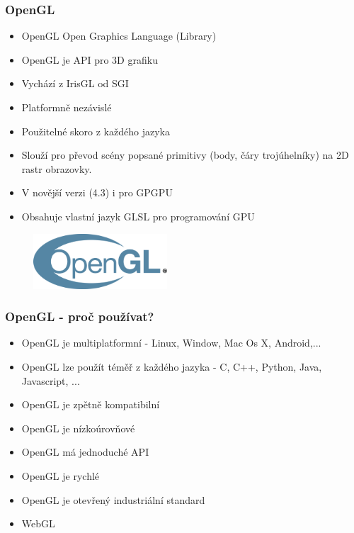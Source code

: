 
\begin{frame}
\frametitle{OpenGL}
  \begin{itemize}
  \item OpenGL Open Graphics Language (Library) 
  \item OpenGL je API pro 3D grafiku 
  \item Vychází z IrisGL od SGI 
  \item Platformně nezávislé 
  \item Použitelné skoro z každého jazyka 
  \item Slouží pro převod scény popsané primitivy (body, čáry trojúhelníky)  na 2D rastr obrazovky.
  \item V novější verzi (4.3) i pro GPGPU
  \item Obsahuje vlastní jazyk GLSL pro programování GPU
  \end{itemize}
  \begin{figure}[h]
  \includegraphics[width=5cm,keepaspectratio]{pics/opengl/logo}
  \end{figure}
\end{frame}

\begin{frame}
\frametitle{OpenGL - proč používat?}
  \begin{itemize}
    \item{OpenGL je multiplatformní - Linux, Window, Mac Os X, Android,...}
    \item{OpenGL lze použít téměř z každého jazyka - C, C++, Python, Java, Javascript, ...}
    \item{OpenGL je zpětně kompatibilní}
    \item{OpenGL je nízkoúrovňové}
    \item{OpenGL má jednoduché API}
    \item{OpenGL je rychlé}
    \item{OpenGL je otevřený industriální standard}
    \item{WebGL}
  \end{itemize}
\end{frame}


